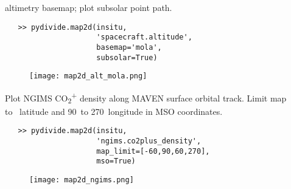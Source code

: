 \documentclass{article}
\begin{document}
\indent altimetry basemap; plot subsolar point path.\\
\vspace{-10mm}
\begin{verbatim}
   >> pydivide.map2d(insitu,
                     'spacecraft.altitude',
                     basemap='mola',
                     subsolar=True)
\end{verbatim}
\begin{figure}[H]
\centering
\texttt{[image: map2d\_alt\_mola.png]}
\end{figure}
\noindent \indent Plot NGIMS CO\textsubscript{2}\textsuperscript{+} density along MAVEN surface orbital track. Limit map \\
\indent to \degree \ latitude and 90\degree \ to 270\degree \ longitude in MSO coordinates.\\
\vspace{-10mm}
\begin{verbatim}
   >> pydivide.map2d(insitu,
                     'ngims.co2plus_density',
                     map_limit=[-60,90,60,270],
                     mso=True)
\end{verbatim}
\begin{figure}[H]
\centering
\texttt{[image: map2d\_ngims.png]}
\end{figure}

\newpage
\end{document}
